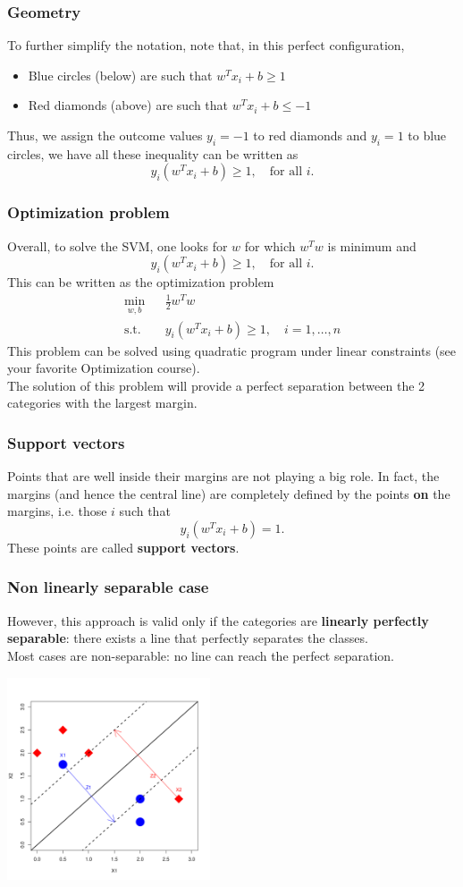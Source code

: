 \begin{frame}
\frametitle{Geometry}
To further simplify the notation, note that, in this perfect configuration, 
\begin{itemize}
\item Blue circles (below) are such that $w^T x_i + b \geq 1$
\item Red diamonds (above) are such that $w^T x_i + b \leq -1$
\end{itemize}
Thus, we assign the outcome values $y_i=-1$ to red diamonds and $y_i=1$ to blue circles, we have all these inequality can be written as
$$
y_i (w^T x_i + b) \geq 1, \quad \mbox{for all } i.
$$
\end{frame}
\begin{frame}
\frametitle{Optimization problem}
Overall, to solve the SVM, one looks for $w$ for which $w^Tw$ is minimum and 
$$
y_i (w^T x_i + b) \geq 1, \quad \mbox{for all } i.
$$
This can be written as the optimization problem
\begin{eqnarray*}
\min_{w, b} && \frac{1}{2}w^Tw  \\
\mbox{s.t. } && y_i(w^Tx_i + b) \geq 1, \quad i=1,\ldots ,n
\end{eqnarray*}
This problem can be solved using quadratic program under linear constraints (see your favorite Optimization course).\\
\vspace{0.2cm}
The solution of this problem will provide a perfect separation between the 2 categories with the largest margin.
\end{frame}
\begin{frame}
\frametitle{Support vectors}
Points that are well inside their margins are not playing a big role. In fact, the margins (and hence the central line) are completely defined by the points {\bf on} the margins, i.e. those $i$ such that
$$
y_i(w^T x_i + b) = 1.
$$ 
These points are called {\bf support vectors}.
\end{frame}
\begin{frame}
\frametitle{Non linearly separable case}
However, this approach is valid only if the categories are {\bf linearly perfectly separable}: there exists a line that perfectly separates the classes.\\
\vspace{0.3cm}
Most cases are non-separable: no line can reach the perfect separation.
\begin{center}
\includegraphics[width=6cm]{../../Graphs/SVM_SoftMargins.png}
\end{center}
\end{frame}
